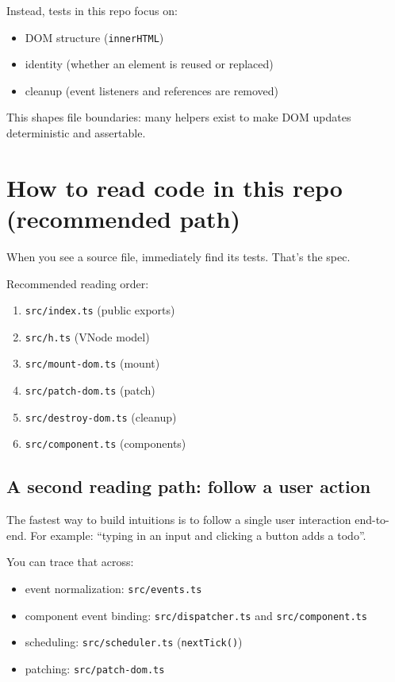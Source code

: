 Instead, tests in this repo focus on:

\begin{itemize}
  \item DOM structure (\texttt{innerHTML})
  \item identity (whether an element is reused or replaced)
  \item cleanup (event listeners and references are removed)
\end{itemize}

This shapes file boundaries: many helpers exist to make DOM updates deterministic and assertable.

\section{How to read code in this repo (recommended path)}
When you see a source file, immediately find its tests. That's the spec.

Recommended reading order:

\begin{enumerate}
  \item \texttt{src/index.ts} (public exports)
  \item \texttt{src/h.ts} (VNode model)
  \item \texttt{src/mount-dom.ts} (mount)
  \item \texttt{src/patch-dom.ts} (patch)
  \item \texttt{src/destroy-dom.ts} (cleanup)
  \item \texttt{src/component.ts} (components)
\end{enumerate}

\subsection{A second reading path: follow a user action}
The fastest way to build intuitions is to follow a single user interaction end-to-end.
For example: ``typing in an input and clicking a button adds a todo''.

You can trace that across:

\begin{itemize}
  \item event normalization: \texttt{src/events.ts}
  \item component event binding: \texttt{src/dispatcher.ts} and \texttt{src/component.ts}
  \item scheduling: \texttt{src/scheduler.ts} (\texttt{nextTick()})
  \item patching: \texttt{src/patch-dom.ts}
\end{itemize}

